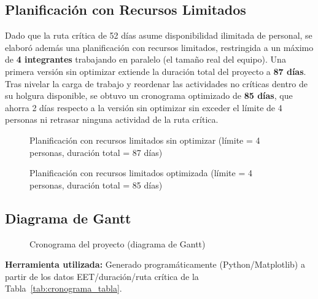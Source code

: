 \subsection{Planificación con Recursos Limitados}
Dado que la ruta crítica de 52 días asume disponibilidad ilimitada de personal, se elaboró además una planificación con recursos limitados, restringida a un máximo de \textbf{4 integrantes} trabajando en paralelo (el tamaño real del equipo). Una primera versión sin optimizar extiende la duración total del proyecto a \textbf{87 días}. Tras nivelar la carga de trabajo y reordenar las actividades no críticas dentro de su holgura disponible, se obtuvo un cronograma optimizado de \textbf{85 días}, que ahorra 2 días respecto a la versión sin optimizar sin exceder el límite de 4 personas ni retrasar ninguna actividad de la ruta crítica.

\begin{figure}[H]
    \centering
    \caption{Planificación con recursos limitados sin optimizar (límite = 4 personas, duración total = 87 días)}
    \label{fig:rl-noopt}
\end{figure}

\begin{figure}[H]
    \centering
    \caption{Planificación con recursos limitados optimizada (límite = 4 personas, duración total = 85 días)}
    \label{fig:rl-opt}
\end{figure}

\subsection{Diagrama de Gantt}
\begin{figure}[H]
    \centering
    \caption{Cronograma del proyecto (diagrama de Gantt)}
    \label{fig:gantt}
\end{figure}
\noindent\textbf{Herramienta utilizada:} Generado programáticamente (Python/Matplotlib) a partir de los datos EET/duración/ruta crítica de la Tabla~\ref{tab:cronograma_tabla}.
\clearpage
